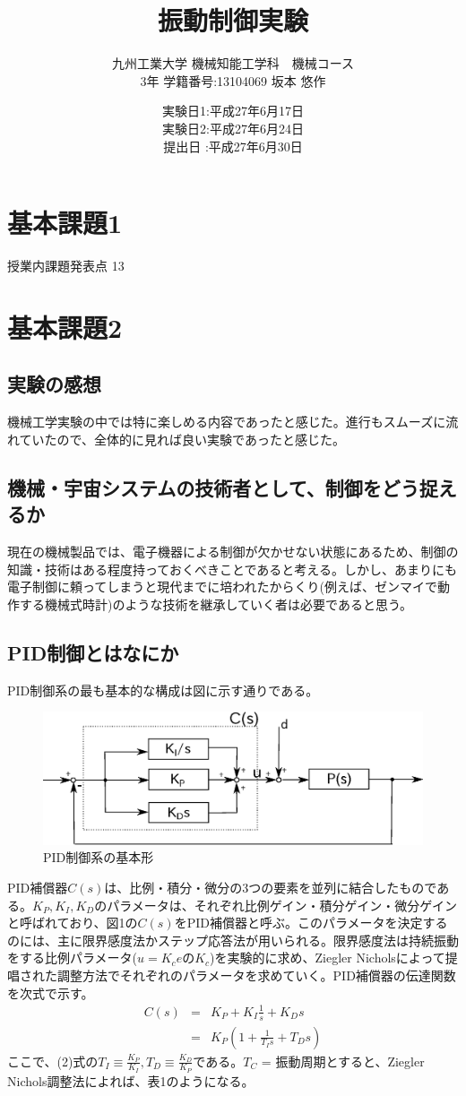 \documentclass[a4j,twoside,openright,11pt]{jarticle}
\title{振動制御実験}
\author{九州工業大学 機械知能工学科　機械コース\\3年 学籍番号:13104069 坂本 悠作}
\date{
実験日1:平成27年6月17日\\
実験日2:平成27年6月24日\\
提出日 :平成27年6月30日
}
\begin{document}
\maketitle

\section{基本課題1}
授業内課題発表点 13
\newpage
\section{基本課題2}
\subsection{実験の感想}
機械工学実験の中では特に楽しめる内容であったと感じた。進行もスムーズに流れていたので、全体的に見れば良い実験であったと感じた。
\subsection{機械・宇宙システムの技術者として、制御をどう捉えるか}
現在の機械製品では、電子機器による制御が欠かせない状態にあるため、制御の知識・技術はある程度持っておくべきことであると考える。しかし、あまりにも電子制御に頼ってしまうと現代までに培われたからくり(例えば、ゼンマイで動作する機械式時計)のような技術を継承していく者は必要であると思う。
\subsection{PID制御とはなにか}
PID制御系の最も基本的な構成は図に示す通りである。
\begin{figure}[htbp]
\begin{center}
\includegraphics[width=12cm]{PID1.eps}
\end{center}
\caption{PID制御系の基本形}
\end{figure}
PID補償器$C(s)$は、比例・積分・微分の3つの要素を並列に結合したものである。$K_P,K_I,K_D$のパラメータは、それぞれ比例ゲイン・積分ゲイン・微分ゲインと呼ばれており、図1の$C(s)$をPID補償器と呼ぶ。このパラメータを決定するのには、主に限界感度法かステップ応答法が用いられる。限界感度法は持続振動をする比例パラメータ($u=K_ceのK_c$)を実験的に求め、Ziegler Nicholsによって提唱された調整方法でそれぞれのパラメータを求めていく。PID補償器の伝達関数を次式で示す。
\begin{eqnarray}
C(s)&=&K_P + K_I\frac{1}{s} + K_Ds\\
    &=&K_P(1+\frac{1}{T_Is}+T_Ds)
\end{eqnarray}
ここで、(2)式の$T_I \equiv \frac{K_P}{K_I},T_D \equiv \frac{K_D}{K_P}$である。$T_C$ = 振動周期とすると、Ziegler Nichols調整法によれば、表1のようになる。
\end{document}
